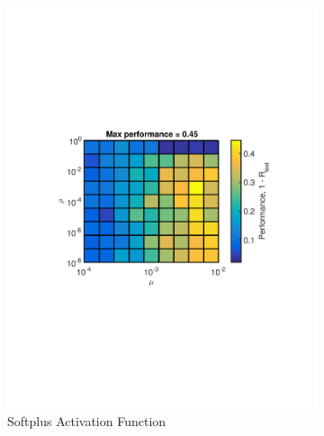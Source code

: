\documentclass[journal,a4paper,onecolumn,11pt]{IEEEtran}
\begin{document}
\begin{figure}[!h] 
	\centering
	\begin{subfigure}{.5\textwidth}
		\centering
		\includegraphics[width=\textwidth]{Opt_sp_hwchar.pdf}
		\caption{Softplus Activation Function}
		\label{fig:Opt_sp_hwchar}
	\end{subfigure}%
	\begin{subfigure}{.5\textwidth}
		\centering

\end{subfigure}
\end{figure}
\end{document}
